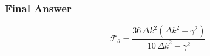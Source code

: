 \subsubsection*{Final Answer}

\[
\boxed{
\mathcal F_\theta
=
\frac{
36\,\Delta k^2\left(\Delta k^2-\gamma^2\right)
}{
10\,\Delta k^2-\gamma^2
}
}
\]